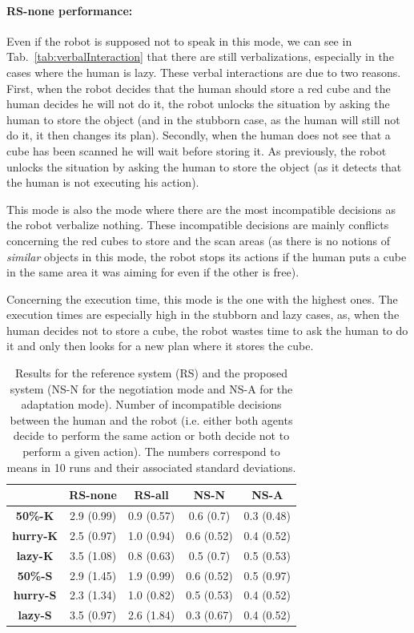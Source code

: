 \documentclass[english,a4paper,11pt,twoside]{StyleThese}
\begin{document}
\paragraph{RS-none performance:} Even if the robot is supposed not to speak in this mode, we can see in Tab.~\ref{tab:verbalInteraction} that there are still verbalizations, especially in the cases where the human is lazy. These verbal interactions are due to two reasons. First, when the robot decides that the human should store a red cube and the human decides he will not do it, the robot unlocks the situation by asking the human to store the object (and in the stubborn case, as the human will still not do it, it then changes its plan). Secondly, when the human does not see that a cube has been scanned he will wait before storing it. As previously, the robot unlocks the situation by asking the human to store the object (as it detects that the human is not executing his action). 

This mode is also the mode where there are the most incompatible decisions as the robot verbalize nothing. These incompatible decisions are mainly conflicts concerning the red cubes to store and the scan areas (as there is no notions of \textit{similar} objects in this mode, the robot stops its actions if the human puts a cube in the same area it was aiming for even if the other is free).

Concerning the execution time, this mode is the one with the highest ones. The execution times are especially high in the stubborn and lazy cases, as, when the human decides not to store a cube, the robot wastes time to ask the human to do it and only then looks for a new plan where it stores the cube. 

\begin{table}[!h]
\centering
  \begin{tabular}{|c||c|c|c|c|}
  \hline
     & \textbf{RS-none} & \textbf{RS-all} & \textbf{NS-N} & \textbf{NS-A} \\
  \hline
  \hline
     \textbf{50\%-K} & 2.9 (0.99) & 0.9 (0.57) & 0.6 (0.7) & 0.3 (0.48) \\
  \hline
     \textbf{hurry-K} & 2.5 (0.97) & 1.0 (0.94) & 0.6 (0.52) & 0.4 (0.52)\\
  \hline
     \textbf{lazy-K} & 3.5 (1.08) & 0.8 (0.63) & 0.5 (0.7) & 0.5 (0.53) \\
  \hline
     \textbf{50\%-S} & 2.9 (1.45) & 1.9 (0.99) & 0.6 (0.52) & 0.5 (0.97) \\
  \hline
     \textbf{hurry-S} & 2.3 (1.34) & 1.0 (0.82) & 0.5 (0.53) & 0.4 (0.52) \\
  \hline
     \textbf{lazy-S} & 3.5 (0.97) & 2.6 (1.84) & 0.3 (0.67) & 0.4 (0.52)  \\
  \hline
  \end{tabular}
   \caption{Results for the reference system (RS) and the proposed system (NS-N for the negotiation mode and NS-A for the adaptation mode). Number of incompatible decisions between the human and the robot (i.e. either both agents decide to perform the same action or both decide not to perform a given action). The numbers correspond to means in 10 runs and their associated standard deviations.}
   \label{tab:incompatibleDecisions} 
\end{table}
\end{document}
